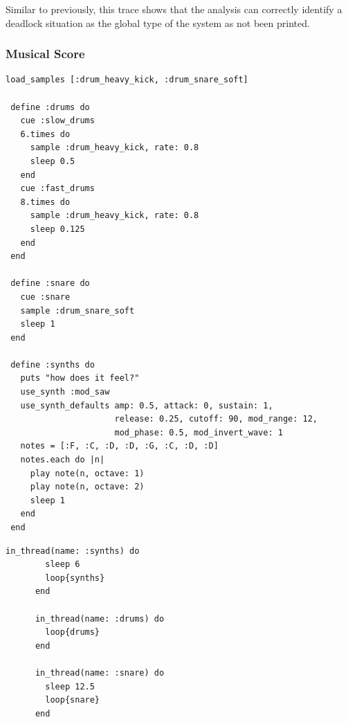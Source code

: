 \documentclass[11pt, abstracton, twoside, titlepage=true]{scrartcl}
\begin{document}
Similar to previously, this trace shows that the analysis can correctly identify 
a deadlock situation as the global type of the system as not been printed. 

\subsubsection{Musical Score}
\begin{minipage}{\textwidth}
	\begin{lstlisting}[style = sonicpi]
 load_samples [:drum_heavy_kick, :drum_snare_soft]

 define :drums do
   cue :slow_drums
   6.times do
     sample :drum_heavy_kick, rate: 0.8
     sleep 0.5
   end
   cue :fast_drums
   8.times do
     sample :drum_heavy_kick, rate: 0.8
     sleep 0.125
   end
 end
 
 define :snare do
   cue :snare
   sample :drum_snare_soft
   sleep 1
 end
 
 define :synths do
   puts "how does it feel?"
   use_synth :mod_saw
   use_synth_defaults amp: 0.5, attack: 0, sustain: 1, 
                      release: 0.25, cutoff: 90, mod_range: 12, 
                      mod_phase: 0.5, mod_invert_wave: 1
   notes = [:F, :C, :D, :D, :G, :C, :D, :D]
   notes.each do |n|
     play note(n, octave: 1)
     play note(n, octave: 2)
     sleep 1
   end
 end
    \end{lstlisting}
\end{minipage}

\begin{minipage}{\textwidth}
	\begin{lstlisting}[style = sonicpi]
      in_thread(name: :synths) do
        sleep 6
        loop{synths}
      end
      
      in_thread(name: :drums) do
        loop{drums}
      end
      
      in_thread(name: :snare) do
        sleep 12.5
        loop{snare}
      end
	\end{lstlisting}
\end{minipage}
\end{document}
